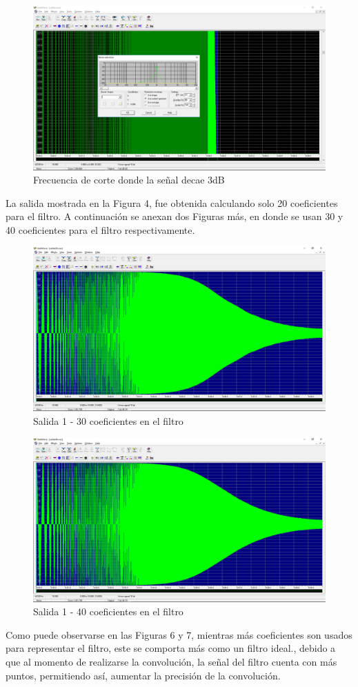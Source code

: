 \begin{figure}[H]
	\centering
	\includegraphics[scale=.4]{img/fc.png}
	\caption{Frecuencia de corte donde la señal decae 3dB}
	\label{fig:fc}		
\end{figure}
La salida mostrada en la Figura 4, fue obtenida calculando solo 20 coeficientes para el filtro. A continuación se anexan dos Figuras más, en donde se usan 30 y 40 coeficientes para el filtro respectivamente.
\begin{figure}[H]
	\centering
	\includegraphics[scale=.28]{img/salida30.png}
	\caption{Salida 1 - 30 coeficientes en el filtro}
	\label{fig:salida30}		
\end{figure}
\begin{figure}[H]
	\centering
	\includegraphics[scale=.28]{img/salida40.png}
	\caption{Salida 1 - 40 coeficientes en el filtro}
	\label{fig:salida30}		
\end{figure}
Como puede observarse en las Figuras 6 y 7, mientras más coeficientes son usados para representar el filtro, este se comporta más como un filtro ideal., debido a que al momento de realizarse la convolución, la señal del filtro cuenta con más puntos, permitiendo así, aumentar la precisión de la convolución.